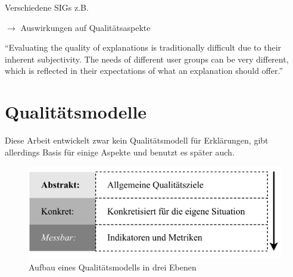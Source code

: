 Verschiedene SIGs z.B. \cite{do2010software}

\citeauthor{chazette_knowledge_nodate} $\rightarrow$ Auswirkungen auf Qualitätsaspekte

“Evaluating the quality of explanations is traditionally difficult due to their inherent subjectivity. The needs of different user groups can be very different, which is reflected in their expectations of what an explanation should offer.” \cite{martin_developing_2019, martin_evaluating_2021}

\section{Qualitätsmodelle}
\label{sec:basics_quality_models}

Diese Arbeit entwickelt zwar kein Qualitätsmodell für Erklärungen, gibt allerdings Basis für einige Aspekte und benutzt es später auch.

\begin{figure}[htb!]
    \centering
    \includegraphics{contents/02_basics/res/quality_models.pdf}
    \caption{Aufbau eines Qualitätsmodells in drei Ebenen \cite[S. 34, ][]{schneider2012abenteuer}}
    \label{fig:basics_quality_models}
\end{figure}

\cite{schneider2012abenteuer}